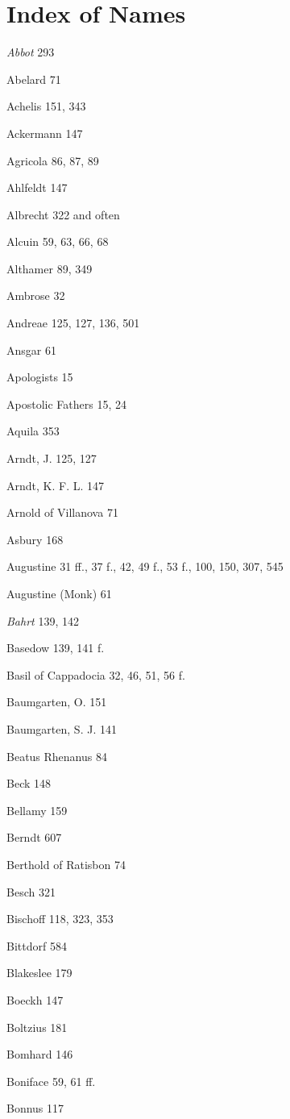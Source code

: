 \chapter{Index of Names}

\emph{Abbot} 293

Abelard 71

Achelis 151, 343

Ackermann 147

Agricola 86, 87, 89

Ahlfeldt 147

Albrecht 322 and often

Alcuin 59, 63, 66, 68

Althamer 89, 349

Ambrose 32

Andreae 125, 127, 136, 501

Ansgar 61

Apologists 15

Apostolic Fathers 15, 24

Aquila 353

Arndt, J. 125, 127

Arndt, K. F. L. 147

Arnold of Villanova 71

Asbury 168

Augustine 31 ff., 37 f., 42, 49 f., 53 f., 100, 150, 307, 545

Augustine (Monk) 61

\emph{Bahrt} 139, 142

Basedow 139, 141 f.

Basil of Cappadocia 32, 46, 51, 56 f.

Baumgarten, O. 151

Baumgarten, S. J. 141

Beatus Rhenanus 84

Beck 148

Bellamy 159

Berndt 607

Berthold of Ratisbon 74

Besch 321

Bischoff 118, 323, 353

Bittdorf 584

Blakeslee 179

Boeckh 147

Boltzius 181

Bomhard 146

Boniface 59, 61 ff.

Bonnus 117

